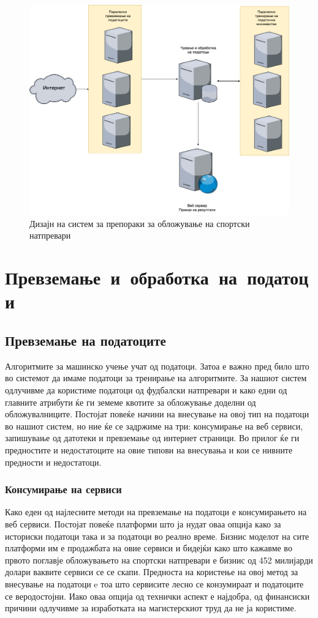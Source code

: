 \begin{figure}[hbtp]
\centering
\includegraphics[scale=0.3]{images/system_design.png}
\caption{Дизајн на систем за препораки  за обложување на спортски натпревари}
\label{fig:system}
\end{figure}

\chapter{\mbox{Превземање и обработка на податоци}}
\label{sec:data}
\section{Превземање на податоците}
Алгоритмите за машинско учење учат од податоци. Затоа е важно пред било што во системот да имаме податоци за тренирање на алгоритмите. За нашиот систем одлучивме да користиме податоци од фудбалски натпревари и како едни од главните атрибути ќе ги земеме квотите за обложување доделни од обложувалниците. Постојат повеќе начини на внесување на овој тип на податоци во нашиот систем, но ние ќе се задржиме на три: консумирање на веб сервиси, запишување од датотеки и превземање од интернет страници. Во прилог ќе ги предностите и недостатоците на овие типови на внесувања и кои се нивните предности и недостатоци.  
\subsection{Консумирање на сервиси}
Како еден од најлесните методи на превземање на податоци е консумирањето на веб сервиси. Постојат повеќе платформи што ја нудат оваа опција како за историски податоци така и за податоци во реално време. Бизнис моделот на сите платформи им е продажбата на овие сервиси и бидејќи како што кажавме во првото поглавје обложувањето на спортски натпревари е бизнис од 452 милијарди долари ваквите сервиси се се скапи. Предноста на користење на овој метод за внесување на податоци e тоа што сервисите лесно се конзумираат и податоците се веродостојни. Иако оваа опција од технички аспект е најдобра, од финансиски причини одлучивме за изработката на магистерскиот труд да не ја користиме.  
